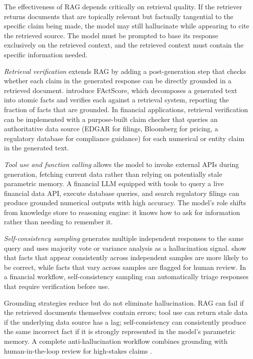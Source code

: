 The effectiveness of RAG depends critically on retrieval quality. If the retriever
returns documents that are topically relevant but factually tangential to the specific
claim being made, the model may still hallucinate while appearing to cite the retrieved
source. The model must be prompted to base its response exclusively on the retrieved
context, and the retrieved context must contain the specific information needed.

\emph{Retrieval verification} extends RAG by adding a post-generation step that checks
whether each claim in the generated response can be directly grounded in a retrieved
document. \citet{min2023factscore} introduce FActScore, which decomposes a generated
text into atomic facts and verifies each against a retrieval system, reporting
the fraction of facts that are grounded. In financial applications, retrieval
verification can be implemented with a purpose-built claim checker that queries
an authoritative data source (EDGAR for filings, Bloomberg for pricing, a regulatory
database for compliance guidance) for each numerical or entity claim in the generated
text.

\emph{Tool use and function calling} \cite{schick2023toolformer} allows the model to
invoke external APIs during generation, fetching current data rather than relying on
potentially stale parametric memory. A financial LLM equipped with tools to query a
live financial data API, execute database queries, and search regulatory filings can
produce grounded numerical outputs with high accuracy. The model's role shifts from
knowledge store to reasoning engine: it knows how to ask for information rather than
needing to remember it.

\emph{Self-consistency sampling} \cite{wang2022selfconsistency} generates multiple
independent responses to the same query and uses majority vote or variance analysis
as a hallucination signal. \citet{manakul2023selfcheckgpt} show that facts that appear
consistently across independent samples are more likely to be correct, while facts that
vary across samples are flagged for human review. In a financial workflow, self-consistency
sampling can automatically triage responses that require verification before use.

\begin{remark}
Grounding strategies reduce but do not eliminate hallucination. RAG can fail if the
retrieved documents themselves contain errors; tool use can return stale data if the
underlying data source has a lag; self-consistency can consistently produce the same
incorrect fact if it is strongly represented in the model's parametric memory. A
complete anti-hallucination workflow combines grounding with human-in-the-loop review
for high-stakes claims \cite{cfa2025llmguide}.
\end{remark}

